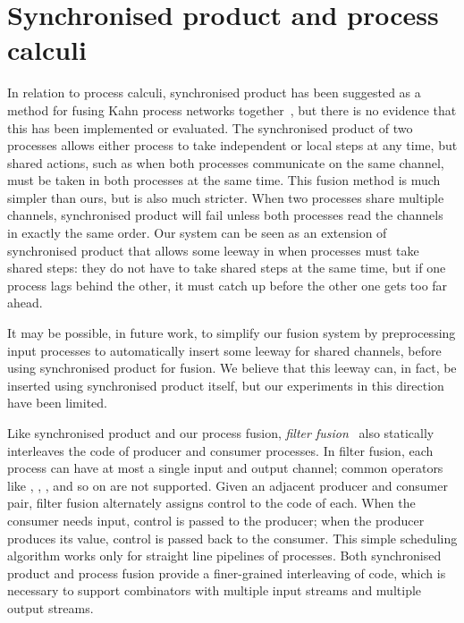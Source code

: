 \section{Synchronised product and process calculi}
\label{related/synchronised-product}

In relation to process calculi, synchronised product has been suggested as a method for fusing Kahn process networks together~\cite{fradet2004network}, but there is no evidence that this has been implemented or evaluated.
The synchronised product of two processes allows either process to take independent or local steps at any time, but shared actions, such as when both processes communicate on the same channel, must be taken in both processes at the same time.
This fusion method is much simpler than ours, but is also much stricter.
When two processes share multiple channels, synchronised product will fail unless both processes read the channels in exactly the same order.
Our system can be seen as an extension of synchronised product that allows some leeway in when processes must take shared steps: they do not have to take shared steps at the same time, but if one process lags behind the other, it must catch up before the other one gets too far ahead.

It may be possible, in future work, to simplify our fusion system by preprocessing input processes to automatically insert some leeway for shared channels, before using synchronised product for fusion.
We believe that this leeway can, in fact, be inserted using synchronised product itself, but our experiments in this direction have been limited.

Like synchronised product and our process fusion, \emph{filter fusion}~\citep{proebsting1996filter} also statically interleaves the code of producer and consumer processes.
In filter fusion, each process can have at most a single input and output channel; common operators like \Hs@zip@, \Hs@unzip@, \Hs@append@, \Hs@partition@ and so on are not supported.
Given an adjacent producer and consumer pair, filter fusion alternately assigns control to the code of each.
When the consumer needs input, control is passed to the producer; when the producer produces its value, control is passed back to the consumer.
This simple scheduling algorithm works only for straight line pipelines of processes.
Both synchronised product and process fusion provide a finer-grained interleaving of code, which is necessary to support combinators with multiple input streams and multiple output streams.

